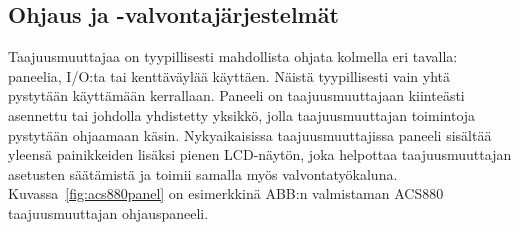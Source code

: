 \documentclass[finnish,12pt,a4paper,pdftex,elec,utf8]{aaltothesis}
\begin{document}
	



\subsection{Ohjaus ja -valvontajärjestelmät}
Taajuusmuuttajaa on tyypillisesti mahdollista ohjata kolmella eri tavalla: paneelia, I/O:ta tai kenttäväylää käyttäen. Näistä tyypillisesti vain yhtä pystytään käyttämään kerrallaan. Paneeli on taajuusmuuttajaan kiinteästi asennettu tai johdolla yhdistetty yksikkö, jolla taajuusmuuttajan toimintoja pystytään ohjaamaan käsin. Nykyaikaisissa taajuusmuuttajissa paneeli sisältää yleensä painikkeiden lisäksi pienen LCD-näytön, joka helpottaa taajuusmuuttajan asetusten säätämistä ja toimii samalla myös valvontatyökaluna. Kuvassa~\ref{fig:acs880panel} on esimerkkinä ABB:n valmistaman ACS880 taajuusmuuttajan ohjauspaneeli. 
\end{document}

